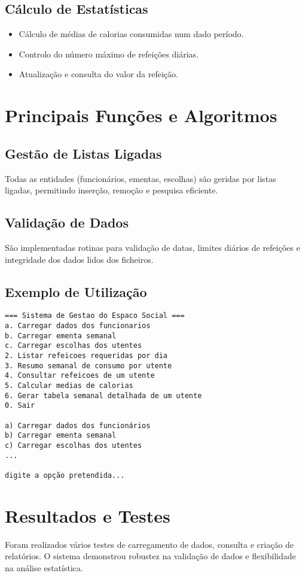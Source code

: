 \documentclass[a4paper,12pt]{report}
\begin{document}
\section{Cálculo de Estatísticas}
\begin{itemize}
    \item Cálculo de médias de calorias consumidas num dado período.
    \item Controlo do número máximo de refeições diárias.
    \item Atualização e consulta do valor da refeição.
\end{itemize}

\chapter{Principais Funções e Algoritmos}
\section{Gestão de Listas Ligadas}
Todas as entidades (funcionários, ementas, escolhas) são geridas por listas ligadas, permitindo inserção, remoção e pesquisa eficiente.

\section{Validação de Dados}
São implementadas rotinas para validação de datas, limites diários de refeições e integridade dos dados lidos dos ficheiros.

\section{Exemplo de Utilização}
\begin{verbatim}
=== Sistema de Gestao do Espaco Social ===
a. Carregar dados dos funcionarios
b. Carregar ementa semanal
c. Carregar escolhas dos utentes
2. Listar refeicoes requeridas por dia
3. Resumo semanal de consumo por utente
4. Consultar refeicoes de um utente
5. Calcular medias de calorias
6. Gerar tabela semanal detalhada de um utente
0. Sair

a) Carregar dados dos funcionários
b) Carregar ementa semanal
c) Carregar escolhas dos utentes
...

digite a opção pretendida...
\end{verbatim}


\chapter{Resultados e Testes}
Foram realizados vários testes de carregamento de dados, consulta e criação de relatórios. O sistema demonstrou robustez na validação de dados e flexibilidade na análise estatística.
\end{document}
